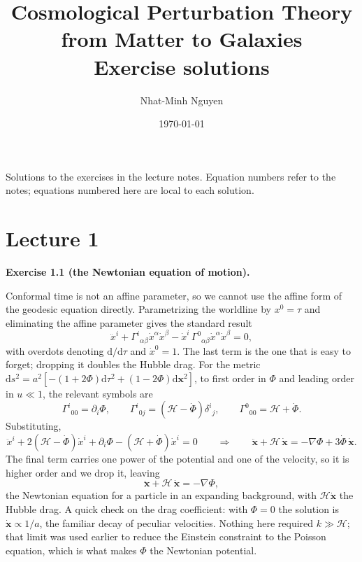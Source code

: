 \documentclass[a4paper,11pt]{article}
\title{Cosmological Perturbation Theory from Matter to Galaxies\\[2mm]
\large Exercise solutions}
\author{Nhat-Minh Nguyen}
\date{\today}
\newcommand{\vx}{\bm{x}}
\def\cH{\mathcal{H}}
\newcommand{\dd}{\mathrm{d}}
\newenvironment{solution}[1]
  {\par\medskip\noindent\textbf{#1}\par\nobreak\smallskip}
  {\par\medskip}
\begin{document}
\maketitle

\noindent Solutions to the exercises in the lecture notes. Equation numbers
refer to the notes; equations numbered here are local to each solution.

\section*{Lecture 1}

\begin{solution}{Exercise 1.1 (the Newtonian equation of motion).}
Conformal time is not an affine parameter, so we cannot use the affine form of
the geodesic equation directly. Parametrizing the worldline by $x^0 = \tau$ and
eliminating the affine parameter gives the standard result
\begin{equation*}
\ddot x^i + \Gamma^i{}_{\alpha\beta}\dot x^\alpha\dot x^\beta
- \dot x^i\,\Gamma^0{}_{\alpha\beta}\dot x^\alpha\dot x^\beta = 0 ,
\end{equation*}
with overdots denoting $\dd/\dd\tau$ and $\dot x^0 = 1$. The last term is the
one that is easy to forget; dropping it doubles the Hubble drag. For the metric
$\dd s^2 = a^2[-(1+2\Phi)\dd\tau^2 + (1-2\Phi)\dd\vx^2]$, to first order in
$\Phi$ and leading order in $u \ll 1$, the relevant symbols are
\begin{equation*}
\Gamma^i{}_{00} = \partial_i\Phi ,
\qquad
\Gamma^i{}_{0j} = \left(\cH - \dot\Phi\right)\delta^i{}_j ,
\qquad
\Gamma^0{}_{00} = \cH + \dot\Phi .
\end{equation*}
Substituting,
\begin{equation*}
\ddot x^i + 2\left(\cH-\dot\Phi\right)\dot x^i + \partial_i\Phi
- \left(\cH+\dot\Phi\right)\dot x^i = 0
\qquad\Longrightarrow\qquad
\ddot{\vx} + \cH\,\dot{\vx} = -\nabla\Phi + 3\dot\Phi\,\dot{\vx} .
\end{equation*}
The final term carries one power of the potential and one of the velocity, so it
is higher order and we drop it, leaving
\begin{equation*}
\ddot{\vx} + \cH\,\dot{\vx} = -\nabla\Phi ,
\end{equation*}
the Newtonian equation for a particle in an expanding background, with $\cH\dot{\vx}$
the Hubble drag. A quick check on the drag coefficient: with $\Phi = 0$ the
solution is $\dot{\vx} \propto 1/a$, the familiar decay of peculiar velocities.
Nothing here required $k \gg \cH$; that limit was used earlier to reduce the
Einstein constraint to the Poisson equation, which is what makes $\Phi$ the
Newtonian potential.
\end{solution}
\end{document}

